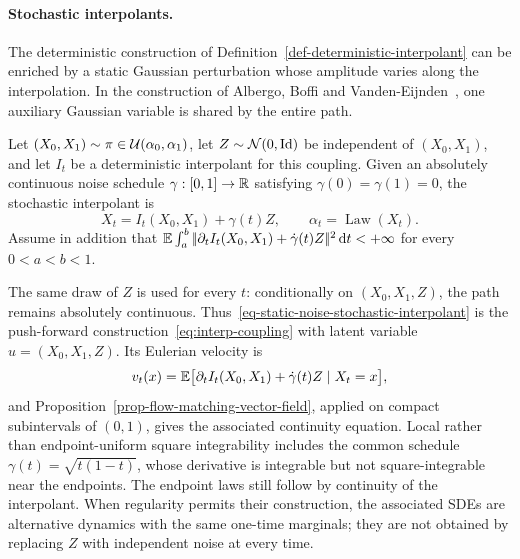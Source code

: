 \paragraph{Stochastic interpolants.}
The deterministic construction of Definition~\ref{def-deterministic-interpolant} can be enriched by a static Gaussian perturbation whose amplitude varies along the interpolation. In the construction of Albergo, Boffi and Vanden-Eijnden~\citep{Albergo2025StochasticInterpolants}, one auxiliary Gaussian variable is shared by the entire path.
\begin{defn}\label{def-stochastic-interpolant}
Let $(X_0,X_1)\sim\pi\in\mathcal{U}(\alpha_0,\alpha_1)$, let $Z\sim\mathcal{N}(0,\mathrm{Id})$ be independent of $(X_0,X_1)$, and let $I_t$ be a deterministic interpolant for this coupling. Given an absolutely continuous noise schedule $\gamma:[0,1]\to\mathbb{R}$ satisfying $\gamma(0)=\gamma(1)=0$, the stochastic interpolant is
\begin{equation}\label{eq-static-noise-stochastic-interpolant}
	X_t=I_t(X_0,X_1)+\gamma(t)Z,
	\qquad \alpha_t=\operatorname{Law}(X_t).
\end{equation}
Assume in addition that $\mathbb{E}\int_a^b|\!| \partial_tI_t(X_0,X_1)+\dot\gamma(t)Z |\!|^2\,\mathrm{d} t<+\infty$ for every $0<a<b<1$.
\end{defn}
The same draw of $Z$ is used for every $t$: conditionally on $(X_0,X_1,Z)$, the path remains absolutely continuous. Thus~\eqref{eq-static-noise-stochastic-interpolant} is the push-forward construction~\eqref{eq:interp-coupling} with latent variable $u=(X_0,X_1,Z)$. Its Eulerian velocity is
\[
	v_t(x)=\mathbb{E}\bigl[\partial_tI_t(X_0,X_1)+\dot\gamma(t)Z\mid X_t=x\bigr],
\]
and Proposition~\ref{prop-flow-matching-vector-field}, applied on compact subintervals of $(0,1)$, gives the associated continuity equation. Local rather than endpoint-uniform square integrability includes the common schedule $\gamma(t)=\sqrt{t(1-t)}$, whose derivative is integrable but not square-integrable near the endpoints. The endpoint laws still follow by continuity of the interpolant. When regularity permits their construction, the associated SDEs are alternative dynamics with the same one-time marginals; they are not obtained by replacing $Z$ with independent noise at every time.

